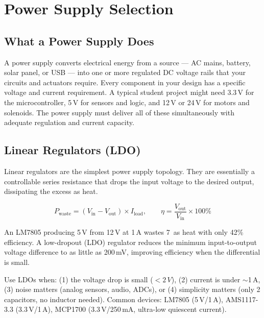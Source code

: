 \documentclass[11pt,letterpaper,twoside,openany]{book}
\begin{document}
\vspace{1em}




\vspace{1em}

\FloatBarrier
\section{Power Supply Selection}

\subsection{What a Power Supply Does}

A power supply converts electrical energy from a source --- AC mains, battery, solar panel, or USB --- into one or more regulated DC voltage rails that your circuits and actuators require. Every component in your design has a specific voltage and current requirement. A typical student project might need 3.3\,V for the microcontroller, 5\,V for sensors and logic, and 12\,V or 24\,V for motors and solenoids. The power supply must deliver all of these simultaneously with adequate regulation and current capacity.

\subsection{Linear Regulators (LDO)}

Linear regulators are the simplest power supply topology. They are essentially a controllable series resistance that drops the input voltage to the desired output, dissipating the excess as heat.

\begin{equation}
  P_{\text{waste}} = (V_{\text{in}} - V_{\text{out}}) \times I_{\text{load}}, \qquad \eta = \frac{V_{\text{out}}}{V_{\text{in}}} \times 100\%
\end{equation}

An LM7805 producing 5\,V from 12\,V at 1\,A wastes 7\, as heat with only 42\% efficiency. A low-dropout (LDO) regulator reduces the minimum input-to-output voltage difference to as little as 200\,mV, improving efficiency when the differential is small.

\begin{tipbox}
Use LDOs when: (1) the voltage drop is small ($<2\,V$), (2) current is under $\sim$1\,A, (3) noise matters (analog sensors, audio, ADCs), or (4) simplicity matters (only 2 capacitors, no inductor needed). Common devices: LM7805 (5\,V/1\,A), AMS1117-3.3 (3.3\,V/1\,A), MCP1700 (3.3\,V/250\,mA, ultra-low quiescent current).
\end{tipbox}
\end{document}
